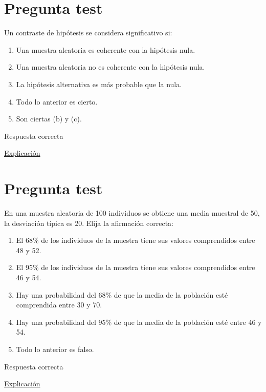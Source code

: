 \documentclass[
]{book}
\providecommand{\tightlist}{%
  \setlength{\itemsep}{0pt}\setlength{\parskip}{0pt}}
\begin{document}
\hypertarget{pregunta-test-102}{%
\section{Pregunta test}\label{pregunta-test-102}}

Un contraste de hipótesis se considera significativo si:

\begin{enumerate}
\def\labelenumi{\alph{enumi})}
\tightlist
\item
  Una muestra aleatoria es coherente con la hipótesis nula.
\item
  Una muestra aleatoria no es coherente con la hipótesis nula.
\item
  La hipótesis alternativa es más probable que la nula.
\item
  Todo lo anterior es cierto.
\item
  Son ciertas (b) y (c).
\end{enumerate}

Respuesta correcta

\href{https://1fjmanzano.github.io/bioestadistica/contrastes-de-hipo\%CC\%81tesis.html}{Explicación}

\hypertarget{pregunta-test-103}{%
\section{Pregunta test}\label{pregunta-test-103}}

En una muestra aleatoria de 100 individuos se obtiene una media muestral de 50, la desviación típica es 20. Elija la afirmación correcta:

\begin{enumerate}
\def\labelenumi{\alph{enumi})}
\tightlist
\item
  El 68\% de los individuos de la muestra tiene sus valores comprendidos entre 48 y 52.
\item
  El 95\% de los individuos de la muestra tiene sus valores comprendidos entre 46 y 54.
\item
  Hay una probabilidad del 68\% de que la media de la población esté comprendida entre 30 y 70.
\item
  Hay una probabilidad del 95\% de que la media de la población esté entre 46 y 54.
\item
  Todo lo anterior es falso.
\end{enumerate}

Respuesta correcta

\href{https://homepage.divms.uiowa.edu/~mbognar/}{Explicación}
\end{document}
